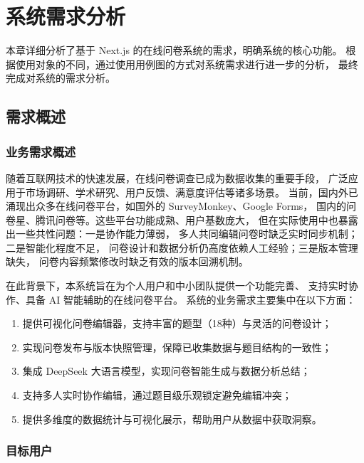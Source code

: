\section{系统需求分析}

本章详细分析了基于 Next.js 的在线问卷系统的需求，明确系统的核心功能。
根据使用对象的不同，通过使用用例图的方式对系统需求进行进一步的分析，
最终完成对系统的需求分析。

\subsection{需求概述}

\subsubsection{业务需求概述}

随着互联网技术的快速发展，在线问卷调查已成为数据收集的重要手段，
广泛应用于市场调研、学术研究、用户反馈、满意度评估等诸多场景。
当前，国内外已涌现出众多在线问卷平台，如国外的 SurveyMonkey、Google Forms，
国内的问卷星、腾讯问卷等。这些平台功能成熟、用户基数庞大，
但在实际使用中也暴露出一些共性问题：一是协作能力薄弱，
多人共同编辑问卷时缺乏实时同步机制；二是智能化程度不足，
问卷设计和数据分析仍高度依赖人工经验；三是版本管理缺失，
问卷内容频繁修改时缺乏有效的版本回溯机制。

在此背景下，本系统旨在为个人用户和中小团队提供一个功能完善、
支持实时协作、具备 AI 智能辅助的在线问卷平台。
系统的业务需求主要集中在以下方面：

\begin{enumerate}[label=(\arabic*)]
  \item 提供可视化问卷编辑器，支持丰富的题型（18种）与灵活的问卷设计；
  \item 实现问卷发布与版本快照管理，保障已收集数据与题目结构的一致性；
  \item 集成 DeepSeek 大语言模型，实现问卷智能生成与数据分析总结；
  \item 支持多人实时协作编辑，通过题目级乐观锁定避免编辑冲突；
  \item 提供多维度的数据统计与可视化展示，帮助用户从数据中获取洞察。
\end{enumerate}

\subsubsection{目标用户}

